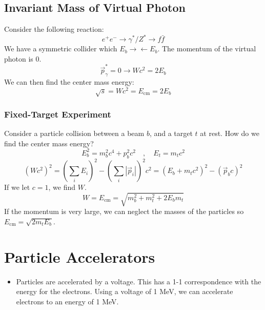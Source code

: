 \subsection{Invariant Mass of Virtual Photon}
Consider the following reaction:
\begin{equation}    
  e^{+} e^{-} → γ^{*} / Z^{*} → f \bar{f}
\end{equation}
We have a symmetric collider which $E_{b} → ← E_{b}$. The momentum of the virtual photon is 0. 
\begin{equation}
  \vec{p}_{γ}^{*} = 0 → Wc^2 = 2E_{b}
\end{equation}
We can then find the center mass energy:
\begin{equation}
  \sqrt{s} = Wc^2 = E_{\text{cm}} = 2E_{b}
\end{equation}

\subsubsection{Fixed-Target Experiment}
Consider a particle collision between a beam $b$, and a target $t$ at rest. How do we find the center mass energy?
\begin{equation}
  E_{b}^2 = m^2_{b}c^{4} + p^2_{b}c^{2} \quad , \quad  E_t = m_{t}c^{2}
\end{equation}
\begin{equation}
  (Wc^2)^2 = \left(∑_{i}^{} E_i\right)^2 - \left(∑_{i}^{} \left|\vec{p}_i\right|\right)^2c^2 = \left(E_{b} + m_tc^2\right)^2 - \left(\vec{p}_{b}c\right)^2
\end{equation}
If we let $c = 1$, we find $W$. 
\begin{equation}
  W = E_{\text{cm}} = \sqrt{m_{b}^2 + m_{t}^2 + 2E_{b}m_{t}}
\end{equation}
If the momentum is very large, we can neglect the masses of the particles so $E_{\text{cm}} = \sqrt{2m_{t}E_{b}}$. 

\section{Particle Accelerators}
\begin{itemize}
    \item Particles are accelerated by a voltage. This has a 1-1 correspondence with the energy for the electrons. Using a voltage of 1 MeV, we can accelerate electrons to an energy of 1 MeV.
    
\end{itemize}

